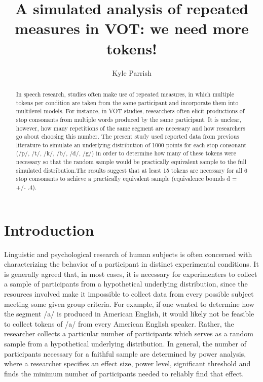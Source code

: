 \documentclass[
  a4paper,
  11pt,
  twocolumn]{article}
\author{}
\date{\vspace{-2.5em}}
\begin{document}
\title{A simulated analysis of repeated measures in VOT: we need more tokens!}
\author{Kyle Parrish}


\maketitle

\begin{abstract}
In speech research, studies often make use of repeated measures, in which multiple tokens per condition are taken from the same participant and incorporate them into multilevel models. For instance, in VOT studies, researchers often elicit productions of stop consonants from multiple words produced by the same participant. It is unclear, however, how many repetitions of the same segment are necessary and how researchers go about choosing this number. The present study used reported data from previous literature to simulate an underlying distribution of 1000 points for each stop consonant (/p/, /t/, /k/, /b/, /d/, /g/) in order to determine how many of these tokens were necessary so that the random sample would be practically equivalent sample to the full simulated distribution.The results suggest that at least 15 tokens are necessary for all 6 stop consonants to achieve a practically equivalent sample (equivalence bounds d = +/- .4).
\end{abstract}



\section{Introduction}

Linguistic and psychological research of human subjects is often
concerned with characterizing the behavior of a participant in distinct
experimental conditions. It is generally agreed that, in most cases, it
is necessary for experimenters to collect a sample of participants from
a hypothetical underlying distribution, since the resources involved
make it impossible to collect data from every possible subject meeting
some given group criteria. For example, if one wanted to determine how
the segment /a/ is produced in American English, it would likely not be
feasible to collect tokens of /a/ from every American English speaker.
Rather, the researcher collects a particular number of participants
which serves as a random sample from a hypothetical underlying
distribution. In general, the number of participants necessary for a
faithful sample are determined by power analysis, where a researcher
specifies an effect size, power level, significant threshold and finds
the minimum number of participants needed to reliably find that effect.
\end{document}
